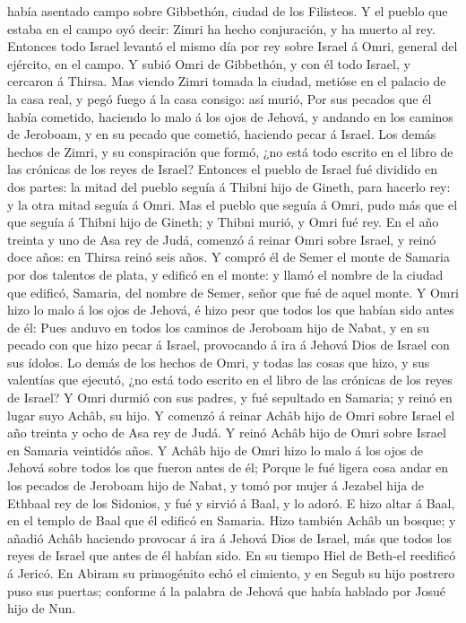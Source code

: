 había asentado campo sobre Gibbethón, ciudad de los Filisteos.
 Y el pueblo que estaba en el campo oyó decir: Zimri ha
hecho conjuración, y ha muerto al rey. Entonces todo Israel levantó el
mismo día por rey sobre Israel á Omri, general del ejército, en el
campo.  Y subió Omri de Gibbethón, y con él todo Israel, y
cercaron á Thirsa.  Mas viendo Zimri tomada la ciudad,
metióse en el palacio de la casa real, y pegó fuego á la casa consigo:
así murió,  Por sus pecados que él había cometido, haciendo
lo malo á los ojos de Jehová, y andando en los caminos de Jeroboam, y en
su pecado que cometió, haciendo pecar á Israel.  Los demás
hechos de Zimri, y su conspiración que formó, ¿no está todo escrito en
el libro de las crónicas de los reyes de Israel?  Entonces
el pueblo de Israel fué dividido en dos partes: la mitad del pueblo
seguía á Thibni hijo de Gineth, para hacerlo rey: y la otra mitad seguía
á Omri.  Mas el pueblo que seguía á Omri, pudo más que el
que seguía á Thibni hijo de Gineth; y Thibni murió, y Omri fué rey.
 En el año treinta y uno de Asa rey de Judá, comenzó á
reinar Omri sobre Israel, y reinó doce años: en Thirsa reinó seis años.
 Y compró él de Semer el monte de Samaria por dos talentos
de plata, y edificó en el monte: y llamó el nombre de la ciudad que
edificó, Samaria, del nombre de Semer, señor que fué de aquel monte.
 Y Omri hizo lo malo á los ojos de Jehová, é hizo peor que
todos los que habían sido antes de él:  Pues anduvo en
todos los caminos de Jeroboam hijo de Nabat, y en su pecado con que hizo
pecar á Israel, provocando á ira á Jehová Dios de Israel con sus ídolos.
 Lo demás de los hechos de Omri, y todas las cosas que
hizo, y sus valentías que ejecutó, ¿no está todo escrito en el libro de
las crónicas de los reyes de Israel?  Y Omri durmió con sus
padres, y fué sepultado en Samaria; y reinó en lugar suyo Achâb, su
hijo.  Y comenzó á reinar Achâb hijo de Omri sobre Israel
el año treinta y ocho de Asa rey de Judá.  Y reinó Achâb
hijo de Omri sobre Israel en Samaria veintidós años. Y Achâb hijo de
Omri hizo lo malo á los ojos de Jehová sobre todos los que fueron antes
de él;  Porque le fué ligera cosa andar en los pecados de
Jeroboam hijo de Nabat, y tomó por mujer á Jezabel hija de Ethbaal rey
de los Sidonios, y fué y sirvió á Baal, y lo adoró.  E hizo
altar á Baal, en el templo de Baal que él edificó en Samaria.
 Hizo también Achâb un bosque; y añadió Achâb haciendo
provocar á ira á Jehová Dios de Israel, más que todos los reyes de
Israel que antes de él habían sido.  En su tiempo Hiel de
Beth-el reedificó á Jericó. En Abiram su primogénito echó el cimiento, y
en Segub su hijo postrero puso sus puertas; conforme á la palabra de
Jehová que había hablado por Josué hijo de Nun.

